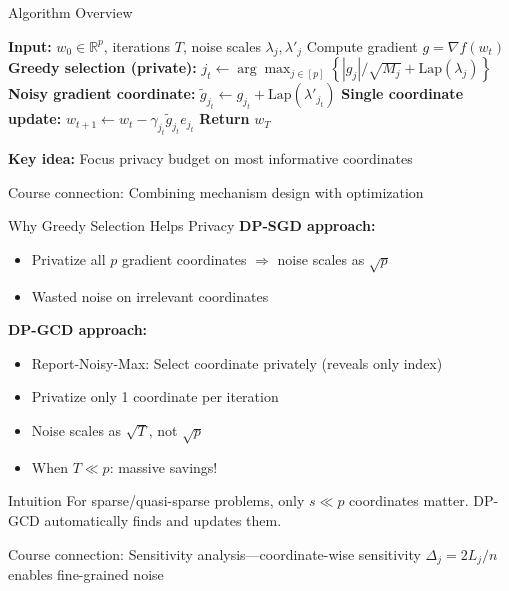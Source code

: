 \documentclass{beamer}
\begin{document}
\begin{frame}{Algorithm Overview}
\begin{algorithm}[H]
\caption{DP-GCD (Simplified)}
\begin{algorithmic}[1]
\State \textbf{Input:} $w_0 \in \mathbb{R}^p$, iterations $T$, noise scales $\lambda_j, \lambda'_j$
    \State Compute gradient $g = \nabla f(w_t)$
    \State \textbf{Greedy selection (private):} $j_t \gets \arg\max_{j \in [p]} \left\{ |g_j|/\sqrt{M_j} + \mathrm{Lap}(\lambda_j) \right\}$
    \State \textbf{Noisy gradient coordinate:} $\tilde{g}_{j_t} \gets g_{j_t} + \mathrm{Lap}(\lambda'_{j_t})$
    \State \textbf{Single coordinate update:} $w_{t+1} \gets w_t - \gamma_{j_t} \tilde{g}_{j_t} e_{j_t}$
\EndFor
\State \textbf{Return} $w_T$
\end{algorithmic}
\end{algorithm}

\vspace{0.5em}

\textbf{Key idea:} Focus privacy budget on most informative coordinates

\vspace{0.3em}

\alert{Course connection:} Combining mechanism design with optimization
\end{frame}

\begin{frame}{Why Greedy Selection Helps Privacy}
\textbf{DP-SGD approach:}
\begin{itemize}
\item Privatize all $p$ gradient coordinates $\Rightarrow$ noise scales as $\sqrt{p}$
\item Wasted noise on irrelevant coordinates
\end{itemize}

\vspace{1em}

\textbf{DP-GCD approach:}
\begin{itemize}
\item Report-Noisy-Max: Select coordinate privately (reveals only index)
\item Privatize only 1 coordinate per iteration
\item Noise scales as $\sqrt{T}$, not $\sqrt{p}$
\item When $T \ll p$: massive savings!
\end{itemize}

\vspace{1em}

\begin{block}{Intuition}
For sparse/quasi-sparse problems, only $s \ll p$ coordinates matter. DP-GCD automatically finds and updates them.
\end{block}

\vspace{0.3em}

\alert{Course connection:} Sensitivity analysis—coordinate-wise sensitivity $\Delta_j = 2L_j/n$ enables fine-grained noise
\end{frame}
\end{document}
